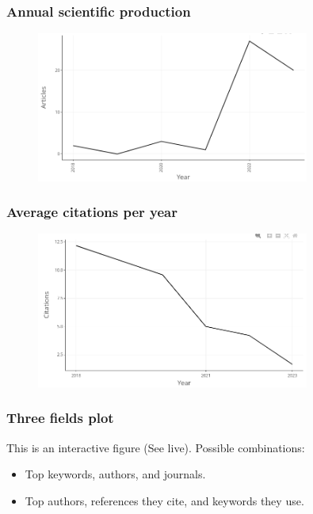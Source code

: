 \documentclass[aspectratio=169]{beamer}
\begin{document}
\begin{frame}
  \frametitle{Annual scientific production}
  \begin{figure}
    \centering
    \includegraphics[width=0.8\textwidth]{img/annual_scientific_production}
    \label{fig:annual_scientific_production}
  \end{figure}
\end{frame}

\begin{frame}
  \frametitle{Average citations per year}
  \begin{figure}
    \centering
    \includegraphics[width=0.8\textwidth]{img/average_citations_per_year}
    \label{fig:average_citations_per_year}
  \end{figure}
\end{frame}

\begin{frame}
  \frametitle{Three fields plot}
  This is an interactive figure (See live). Possible combinations:
  \begin{itemize}
    \item Top keywords, authors, and journals. 
    \item Top authors, references they cite, and keywords they use. 
  \end{itemize}
\end{frame}
\end{document}
